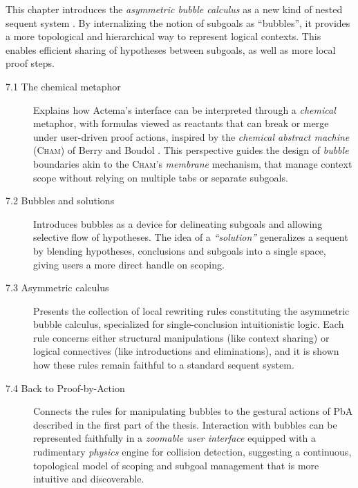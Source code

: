 \documentclass[11pt]{article}
\begin{document}
This chapter introduces the \emph{asymmetric bubble calculus} as a new kind of nested sequent system \cite{brunnler_deep_2009}. By internalizing the notion of subgoals as ``bubbles'', it provides a more topological and hierarchical way to represent logical contexts. This enables efficient sharing of hypotheses between subgoals, as well as more local proof steps.

\begin{description}

  \item[7.1 The chemical metaphor]
  Explains how Actema's interface can be interpreted through a \emph{chemical} metaphor, with formulas viewed as reactants that can break or merge under user-driven proof actions, inspired by the \emph{chemical abstract machine} (\textsc{Cham}) of Berry and Boudol \cite{berry_chemical_1989}. This perspective guides the design of \emph{bubble} boundaries akin to the \textsc{Cham}'s \emph{membrane} mechanism, that manage context scope without relying on multiple tabs or separate subgoals.

  \item[7.2 Bubbles and solutions]
  Introduces bubbles as a device for delineating subgoals and allowing selective flow of hypotheses. The idea of a \emph{``solution''} generalizes a sequent by blending hypotheses, conclusions and subgoals into a single space, giving users a more direct handle on scoping.

  \item[7.3 Asymmetric calculus]
  Presents the collection of local rewriting rules constituting the asymmetric bubble calculus, specialized for single-conclusion intuitionistic logic. Each rule concerns either structural manipulations (like context sharing) or logical connectives (like introductions and eliminations), and it is shown how these rules remain faithful to a standard sequent system.

  \item[7.4 Back to Proof-by-Action]
  Connects the rules for manipulating bubbles to the gestural actions of PbA described in the first part of the thesis. Interaction with bubbles can be represented faithfully in a \emph{zoomable user interface} \cite{perlinPadAlternativeApproach1993} equipped with a rudimentary \emph{physics} engine for collision detection, suggesting a continuous, topological model of scoping and subgoal management that is more intuitive and discoverable.

\end{description}
\end{document}
